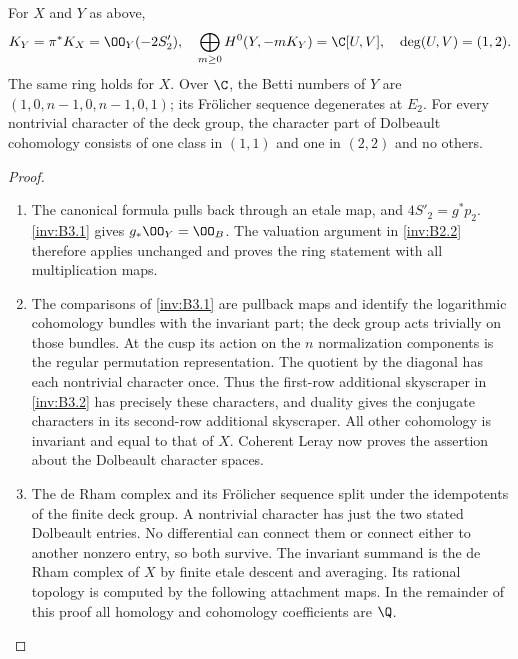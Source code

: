 \begin{proposition}\hypertarget{tag-01S9}{}\label{inv:B3.3}

For $X$ and $Y$ as above,
\[
K_Y=\pi^*K_X=\OO_Y(-2S'_2),\quad
\bigoplus_{m\ge0}H^0(Y,-mK_Y)=\C[U,V],\quad
\deg(U,V)=(1,2).
\]
The same ring holds for $X$.
Over $\C$, the Betti numbers of $Y$ are
$(1,0,n-1,0,n-1,0,1)$; its Fr\"olicher sequence degenerates at $E_2$.
For every nontrivial character of the deck group, the character
part of Dolbeault cohomology consists of one class in $(1,1)$ and
one in $(2,2)$ and no others.
\end{proposition}


\begin{proof}
\begin{enumerate}[label=\arabic*.,leftmargin=*]
\item The canonical formula pulls back through an etale map, and
$4S'_2=g^*p_2$. \ref{inv:B3.1} gives $g_*\OO_Y=\OO_B$.
The valuation argument in \ref{inv:B2.2} therefore applies unchanged and proves
the ring statement with all multiplication maps.

\item The comparisons of \ref{inv:B3.1} are pullback maps and identify the logarithmic
cohomology bundles with the invariant part; the deck group acts
trivially on those bundles. At the cusp its action on the $n$
normalization components is the regular permutation representation.
The quotient by the diagonal has each nontrivial character once.
Thus the first-row additional skyscraper in \ref{inv:B3.2} has precisely these
characters, and duality gives the conjugate characters in its
second-row additional skyscraper. All other cohomology is invariant
and equal to that of $X$. Coherent Leray now proves the assertion
about the Dolbeault character spaces.

\item The de Rham complex and its Fr\"olicher sequence split under the
idempotents of the finite deck group. A nontrivial character has just
the two stated Dolbeault entries. No differential can connect them
or connect either to another nonzero entry, so both survive.
The invariant summand is the de Rham complex of $X$ by finite
etale descent and averaging. Its rational topology is computed by the following attachment maps. In the remainder of this proof
all homology and cohomology coefficients are $\Q$.


\end{enumerate}
\end{proof}
